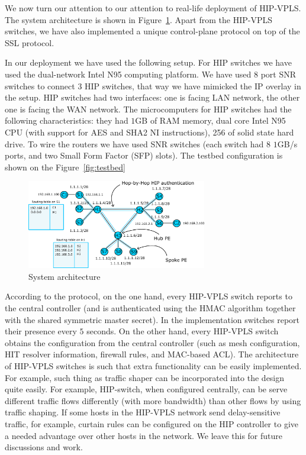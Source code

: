 We now turn our attention to our attention to real-life deployment 
of HIP-VPLS. The system architecture is shown in Figure~\ref{fig:architecture}. 
Apart from the HIP-VPLS switches, we have also implemented a unique 
control-plane protocol on top of the SSL protocol. 

In our deployment we have used the following setup. For HIP switches we 
have used the dual-network Intel N95 computing platform. We have used $8$ 
port SNR switches to connect 3 HIP switches, that way we have mimicked the 
IP overlay in the setup. HIP switches had two interfaces: one is facing 
LAN network, the other one is facing the WAN network. The microcomputers for
HIP switches had the following characteristics: they had $1$GB of RAM memory, 
dual core Intel N95 CPU (with support for AES and SHA2 NI instructions), 256 of 
solid state hard drive. To wire the routers we have used SNR switches 
(each switch had $8$ $1$GB/s ports, and two Small Form Factor (SFP) slots). 
The testbed configuration is shown on the Figure~\ref{fig:testbed}


\begin{figure}[h!]
\centering
\includegraphics[width=0.7\textwidth]{graphics/arch.png}
\caption{System architecture}
\label{fig:architecture}
\end{figure} 

According to the protocol, on the one hand, every HIP-VPLS 
switch reports to the central controller (and is authenticated 
using the HMAC algorithm together with the shared symmetric 
master secret). In the implementation switches report their presence every $5$ 
seconds. On the other hand, every HIP-VPLS switch obtains 
the configuration from the central controller (such as mesh 
configuration, HIT resolver information, firewall rules, and 
MAC-based ACL). The architecture of HIP-VPLS switches is such
that extra functionality can be easily implemented. For example,
such thing as traffic shaper can be incorporated into the design
quite easily. For example, HIP-switch, when configured centrally, 
can be serve different traffic flows differently (with more bandwidth) than other 
flows by using traffic shaping. If some hosts in the HIP-VPLS network send delay-sensitive traffic, 
for example, curtain rules can be configured on the HIP controller 
to give a needed advantage over other hosts in the network. We 
leave this for future discussions and work.

